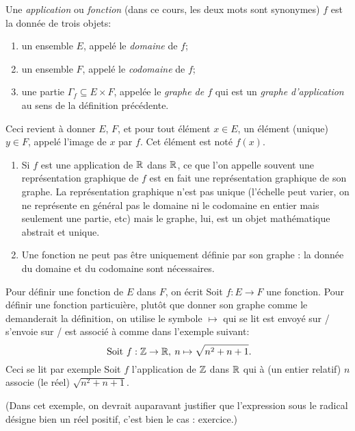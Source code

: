 \begin{definition}
Une \emph{application} ou \emph{fonction} (dans ce cours, les deux mots sont synonymes) $f$ est la donnée de trois objets:
\begin{enumerate}
\item un ensemble $E$, appelé le \emph{domaine} de $f$;
\item un ensemble $F$, appelé le \emph{codomaine} de $f$;
\item une partie $\Gamma_f \subseteq E\times F$, appelée le \emph{graphe de $f$} qui est un \emph{graphe d'application} au sens de la définition précédente. 
\end{enumerate}
Ceci revient à donner $E$, $F$, et pour tout élément $x \in E$, un élément (unique) $y\in F$, appelé l'image de $x$ par $f$. Cet élément est noté $f(x)$.
\end{definition}


\begin{remarque}
\begin{enumerate}
\item Si $f$ est une application de $\mathbb{R}$ dans $\mathbb{R}$, ce que l'on appelle souvent une \og représentation graphique de $f$\fg{} est en fait une représentation graphique de son graphe. La représentation graphique n'est pas unique (l'échelle peut varier, on ne représente en général pas le domaine ni le codomaine en entier mais seulement une partie, etc) mais le graphe, lui, est un objet mathématique abstrait et unique.
\item Une fonction ne peut pas être uniquement définie par son graphe : la donnée du domaine et du codomaine sont nécessaires.
\end{enumerate}
\end{remarque}

Pour définir une fonction de $E$ dans $F$, on écrit \og Soit $f : E\to F$ une fonction\fg. Pour définir une fonction particuière, plutôt que donner son graphe comme le demanderait la définition, on utilise le symbole \og$\mapsto$\fg{} qui se lit \og est envoyé sur / s'envoie sur / est associé à \fg{} comme dans l'exemple suivant:
\[
\text{ Soit } f :\mathbb{Z} \to \mathbb{R},\: n\mapsto \sqrt{n^2+n+1}.
\]
Ceci se lit par exemple \og Soit $f$ l'application de $\mathbb{Z}$ dans $\mathbb{R}$ qui à (un entier relatif) $n$ associe (le réel) $\sqrt{n^2+n+1}$\fg.


(Dans cet exemple, on devrait auparavant justifier que l'expression sous le radical désigne bien un réel positif, c'est bien le cas : exercice.)

